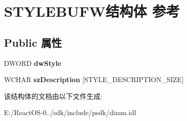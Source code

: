 \hypertarget{struct_s_t_y_l_e_b_u_f_w}{}\section{S\+T\+Y\+L\+E\+B\+U\+F\+W结构体 参考}
\label{struct_s_t_y_l_e_b_u_f_w}
\subsection*{Public 属性}
\begin{DoxyCompactItemize}
\item 
\mbox{\label{struct_s_t_y_l_e_b_u_f_w_a033fc31e4f245b4c832d91c78304ba65}} 
D\+W\+O\+RD {\bfseries dw\+Style}
\item 
\mbox{\label{struct_s_t_y_l_e_b_u_f_w_a7219a3ad09fab4e9c009695599ee1d16}} 
W\+C\+H\+AR {\bfseries sz\+Description} \mbox{[}S\+T\+Y\+L\+E\+\_\+\+D\+E\+S\+C\+R\+I\+P\+T\+I\+O\+N\+\_\+\+S\+I\+ZE\mbox{]}
\end{DoxyCompactItemize}


该结构体的文档由以下文件生成\+:\begin{DoxyCompactItemize}
\item 
E\+:/\+React\+O\+S-\/0../sdk/include/psdk/dimm.\+idl\end{DoxyCompactItemize}
